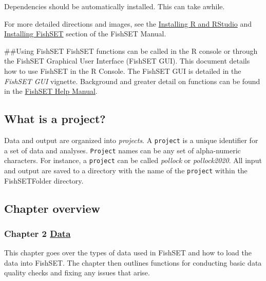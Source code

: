 \documentclass[
]{article}
\begin{document}
Dependencies should be automatically installed. This can take awhile.

For more detailed directions and images, see the \href{https://docs.google.com/document/d/1dzXsVt5iWcAQooDDXRJ3XyMoqnSmpZOqirU_f_PnQUM/edit\#heading=h.1fob9te}{Installing R and RStudio} and \href{https://docs.google.com/document/d/1dzXsVt5iWcAQooDDXRJ3XyMoqnSmpZOqirU_f_PnQUM/edit\#heading=h.h8fxguvqf0mn}{Installing FishSET} section of the FishSET Manual.

\#\#Using FishSET
FishSET functions can be called in the R console or through the FishSET Graphical User Interface (FishSET GUI). This document details how to use FishSET in the R Console. The FishSET GUI is detailed in the \emph{FishSET GUI} vignette. Background and greater detail on functions can be found in the \href{https://docs.google.com/document/d/1dzXsVt5iWcAQooDDXRJ3XyMoqnSmpZOqirU_f_PnQUM/edit?usp=sharing}{FishSET Help Manual}.

\hypertarget{what-is-a-project}{%
\subsection{What is a project?}\label{what-is-a-project}}

Data and output are organized into \emph{projects}. A \texttt{project} is a unique identifier for a set of data and analyses. \texttt{Project} names can be any set of alpha-numeric characters. For instance, a \texttt{project} can be called \emph{pollock} or \emph{pollock2020}. All input and output are saved to a directory with the name of the \texttt{project} within the FishSETFolder directory.

\hypertarget{chapter-overview}{%
\subsection{Chapter overview}\label{chapter-overview}}

\hypertarget{chapter-2-data}{%
\subsubsection{\texorpdfstring{Chapter 2 \protect\hyperlink{data}{Data}}{Chapter 2 Data}}\label{chapter-2-data}}

This chapter goes over the types of data used in FishSET and how to load the data into FishSET. The chapter then outlines functions for conducting basic data quality checks and fixing any issues that arise.
\end{document}

